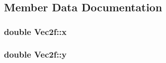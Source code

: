 \subsection{Member Data Documentation}
\subsubsection[{\texorpdfstring{x}{x}}]{\setlength{\rightskip}{0pt plus 5cm}double Vec2f\+::x}\hypertarget{class_vec2f_aae649f38fb692202ed76dd1783c02d1f}{}\label{class_vec2f_aae649f38fb692202ed76dd1783c02d1f}
\subsubsection[{\texorpdfstring{y}{y}}]{\setlength{\rightskip}{0pt plus 5cm}double Vec2f\+::y}\hypertarget{class_vec2f_a6215e122ad762df0beb90949f8e1859a}{}\label{class_vec2f_a6215e122ad762df0beb90949f8e1859a}

